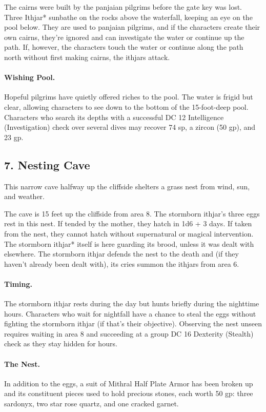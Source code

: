 \documentclass[10pt,a4paper,twoside,twocolumn,openany,bg=print,nodeprecatedcode]{dndbook}
\begin{document}
The cairns were built by the panjaian pilgrims before the gate key was lost. Three Ithjar* sunbathe on the rocks above the waterfall, keeping an eye on the pool below. They are used to panjaian pilgrims, and if the characters create their own cairns, they're ignored and can investigate the water or continue up the path. If, however, the characters touch the water or continue along the path north without first making cairns, the ithjars attack.
\paragraph{Wishing Pool.}
Hopeful pilgrims have quietly offered riches to the pool. The water is frigid but clear, allowing characters to see down to the bottom of the 15-foot-deep pool. Characters who search its depths with a successful DC 12 Intelligence (Investigation) check over several dives may recover 74 sp, a zircon (50 gp), and 23 gp.
\subsection{7. Nesting Cave}
\begin{DndReadAloud}{}
This narrow cave halfway up the cliffside shelters a grass nest from wind, sun, and weather.
\end{DndReadAloud}

The cave is 15 feet up the cliffside from area 8. The stormborn ithjar's three eggs rest in this nest. If tended by the mother, they hatch in 1d6 + 3 days. If taken from the nest, they cannot hatch without supernatural or magical intervention. The stormborn ithjar* itself is here guarding its brood, unless it was dealt with elsewhere. The stormborn ithjar defends the nest to the death and (if they haven't already been dealt with), its cries summon the ithjars from area 6.
\paragraph{Timing.}
The stormborn ithjar rests during the day but hunts briefly during the nighttime hours. Characters who wait for nightfall have a chance to steal the eggs without fighting the stormborn ithjar (if that's their objective). Observing the nest unseen requires waiting in area 8 and succeeding at a group DC 16 Dexterity (Stealth) check as they stay hidden for hours.
\paragraph{The Nest.}
In addition to the eggs, a suit of Mithral Half Plate Armor has been broken up and its constituent pieces used to hold precious stones, each worth 50 gp: three sardonyx, two star rose quartz, and one cracked garnet.
\end{document}
